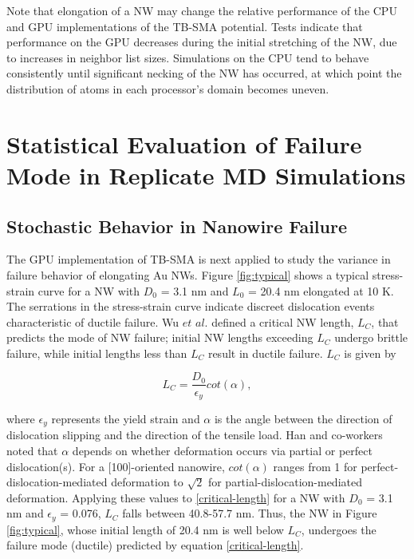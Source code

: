 \documentclass[10pt]{report}  %
\newcommand\findent{\hspace*{\parindent}}
\begin{document}
Note that elongation of a NW may change the relative performance of the CPU and GPU implementations of the TB-SMA potential. Tests indicate that performance on the GPU decreases during the initial stretching of the NW, due to increases in neighbor list sizes. Simulations on the CPU tend to behave consistently until significant necking of the NW has occurred, at which point the distribution of atoms in each processor's domain becomes uneven.  

\section{Statistical Evaluation of Failure Mode in Replicate MD Simulations}

\subsection{Stochastic Behavior in Nanowire Failure}

\findent The GPU implementation of TB-SMA is next applied to study the variance in failure behavior of elongating Au NWs. Figure \ref{fig:typical} shows a typical stress-strain curve for a NW with $D_{0}$ = 3.1 nm and $L_{0}$ = 20.4 nm elongated at 10 K. The serrations in the stress-strain curve indicate discreet dislocation events characteristic of ductile failure. Wu $et$ $al.$ \cite{Wu:2012} defined a critical NW length, $L_{C}$, that predicts the mode of NW failure; initial NW lengths exceeding $L_{C}$ undergo brittle failure, while initial lengths less than $L_{C}$ result in ductile failure. $L_{C}$ is given by

\begin{equation}
L_{C} = \frac{D_{0}}{\epsilon_{y}}cot(\alpha),\label{critical-length}
\end{equation} 

\noindent where $\epsilon_{y}$ represents the yield strain and $\alpha$ is the angle between the direction of dislocation slipping and the direction of the tensile load. Han and co-workers \cite{Han:2012} noted that $\alpha$ depends on whether deformation occurs via partial or perfect dislocation(s). For a [100]-oriented nanowire, $cot(\alpha)$ ranges from 1 for perfect-dislocation-mediated deformation to $\sqrt{2}$ for partial-dislocation-mediated deformation. Applying these values to \ref{critical-length} for a NW with $D_{0}$ = 3.1 nm and $\epsilon_{y}$ = 0.076, $L_{C}$ falls between 40.8-57.7 nm. Thus, the NW in Figure \ref{fig:typical}, whose initial length of 20.4 nm is well below $L_{C}$, undergoes the failure mode (ductile) predicted by equation \ref{critical-length}.       
\end{document}
